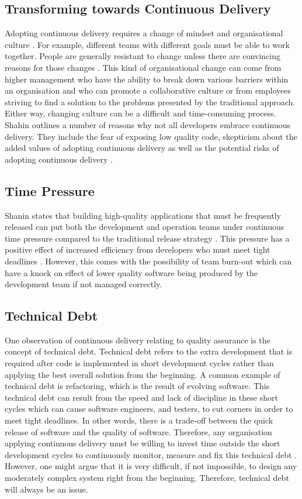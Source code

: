 \documentclass[10pt,journal,compsoc]{IEEEtran}
\begin{document}
\subsection{Transforming towards Continuous Delivery}
Adopting continuous delivery requires a change of mindset and organisational culture \cite{chen2015continuous}. For example, different teams with different goals must be able to work together. People are generally resistant to change unless there are convincing reasons for those changes \cite{shahin2017continuous}. This kind of organisational change can come from higher management who have the ability to break down various barriers within an organisation and who can promote a collaborative culture or from employees striving to find a solution to the problems presented by the traditional approach. Either way, changing culture can be a difficult and time-consuming process. Shahin outlines a number of reasons why not all developers embrace continuous delivery. They include the fear of exposing low quality code, skepticism about the added values of adopting continuous delivery as well as the potential risks of adopting continuous delivery \cite{shahin2017continuous}.

\subsection{Time Pressure}
Shanin states that building high-quality applications that must be frequently released can put both the development and operation teams under continuous time pressure compared to the traditional release strategy \cite{shahin2017continuous}. This pressure has a positive effect of increased efficiency from developers who must meet tight deadlines \cite{mantyla2015rapid}. However, this comes with the possibility of team burn-out which can have a knock on effect of lower quality software being produced by the development team if not managed correctly.

\subsection{Technical Debt}
One observation of continuous delivery relating to quality assurance is the concept of technical debt. Technical debt refers to the extra development that is required after code is implemented in short development cycles rather than applying the best overall solution from the beginning. A common example of technical debt is refactoring, which is the result of evolving software. This technical debt can result from the speed and lack of discipline in these short cycles which can cause software engineers, and testers, to cut corners in order to meet tight deadlines. In other words, there is a trade-off between the quick release of software and the quality of software. Therefore, any organisation applying continuous delivery must be willing to invest time outside the short development cycles to continuously monitor, measure and fix this technical debt \cite{RODRIGUEZ2017263}. However, one might argue that it is very difficult, if not impossible, to design any moderately complex system right from the beginning. Therefore, technical debt will always be an issue.
\end{document}
